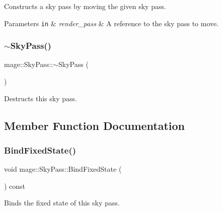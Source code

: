 Constructs a sky pass by moving the given sky pass.


\begin{DoxyParams}[1]{Parameters}
\mbox{\tt in}  & {\em render\+\_\+pass} & A reference to the sky pass to move. \\
\hline
\end{DoxyParams}
\hypertarget{classmage_1_1_sky_pass_ab3e581e2eedfc62e13c71d91359f71ce}{}\label{classmage_1_1_sky_pass_ab3e581e2eedfc62e13c71d91359f71ce} 
\subsubsection{\texorpdfstring{$\sim$\+Sky\+Pass()}{~SkyPass()}}
{\footnotesize\ttfamily mage\+::\+Sky\+Pass\+::$\sim$\+Sky\+Pass (\begin{DoxyParamCaption}{ }\end{DoxyParamCaption})\hspace{0.3cm}{\ttfamily [default]}}

Destructs this sky pass. 

\subsection{Member Function Documentation}
\hypertarget{classmage_1_1_sky_pass_aa74c5e32a917aac610b2c7e4750c4639}{}\label{classmage_1_1_sky_pass_aa74c5e32a917aac610b2c7e4750c4639} 
\subsubsection{\texorpdfstring{Bind\+Fixed\+State()}{BindFixedState()}}
{\footnotesize\ttfamily void mage\+::\+Sky\+Pass\+::\+Bind\+Fixed\+State (\begin{DoxyParamCaption}{ }\end{DoxyParamCaption}) const\hspace{0.3cm}{\ttfamily [noexcept]}}

Binds the fixed state of this sky pass. \hypertarget{classmage_1_1_sky_pass_a6df5be2de9df87db05ca1fba06169c4c}{}\label{classmage_1_1_sky_pass_a6df5be2de9df87db05ca1fba06169c4c} 
